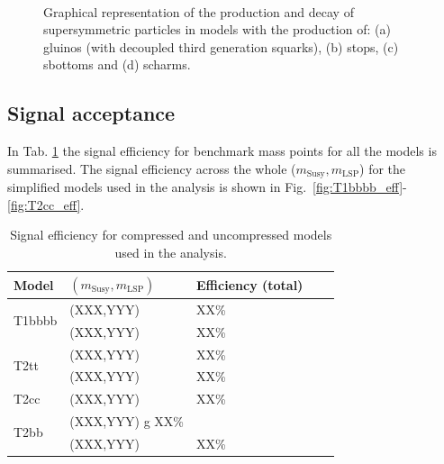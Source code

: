 \begin{figure}[h!]
\begin{center}
{            \label{fig:T2cc_feyn}
            } ~~
        \caption{Graphical representation of the production and decay of
            supersymmetric particles in models with the production of: (a)
            gluinos (with decoupled third generation squarks), (b) stops, (c)
            sbottoms and (d) scharms.}
        \label{fig:simplified-models-feyn}
    \end{center}
\end{figure}

\subsection{Signal acceptance}
\label{sec:sig-accept-contam}
In Tab. \ref{tab:sig-eff} the signal efficiency for benchmark mass points for
all the models is summarised. The signal efficiency across the whole
($m_{\mathrm{Susy}},m_{\mathrm{LSP}}$) for the simplified models used in the
analysis is shown in Fig.~\ref{fig:T1bbbb_eff}-\ref{fig:T2cc_eff}.

\begin{table}[h!]
    \caption{Signal efficiency for compressed and uncompressed models used in
        the analysis.}
    \label{tab:sig-eff}
    \centering
    \begin{tabular}{ lllll }
        \hline \hline
        Model & $(m_{\mathrm{Susy}},m_{\mathrm{LSP}})$ & Efficiency (total) \\ 
        \hline
        \multirow{2}{*}{T1bbbb}
            & (XXX,YYY) & XX\% \\
            & (XXX,YYY) & XX\% \\
        \hline
        \multirow{2}{*}{T2tt}
            & (XXX,YYY) & XX\% \\
            & (XXX,YYY) & XX\% \\
        \hline
        T2cc
            & (XXX,YYY) & XX\% \\
        \hline
        \multirow{2}{*}{T2bb}
            & (XXX,YYY) g XX\% \\
            & (XXX,YYY) & XX\% \\
        \hline \hline
    \end{tabular}
\end{table}

